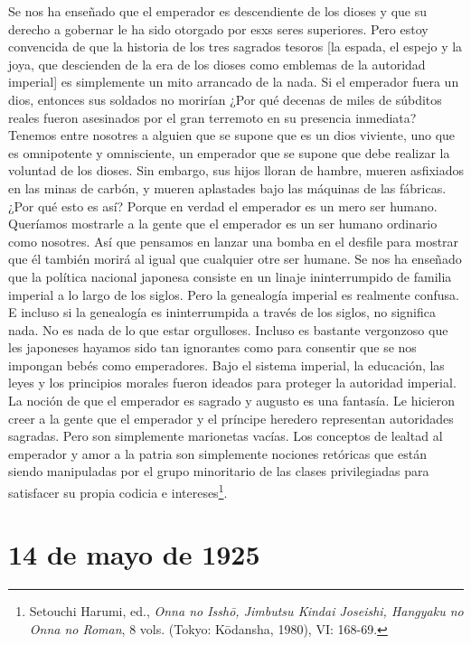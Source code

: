 \documentclass[
]{book}
\begin{document}
Se nos ha enseñado que el emperador es descendiente de los dioses y que su derecho a gobernar le ha sido otorgado por esxs seres superiores. Pero estoy convencida de que la historia de los tres sagrados tesoros {[}la espada, el espejo y la joya, que descienden de la era de los dioses como emblemas de la autoridad imperial{]} es simplemente un mito arrancado de la nada. Si el emperador fuera un dios, entonces sus soldados no morirían ¿Por qué decenas de miles de súbditos reales fueron asesinados por el gran terremoto en su presencia inmediata? Tenemos entre nosotres a alguien que se supone que es un dios viviente, uno que es omnipotente y omnisciente, un emperador que se supone que debe realizar la voluntad de los dioses. Sin embargo, sus hijos lloran de hambre, mueren asfixiados en las minas de carbón, y mueren aplastades bajo las máquinas de las fábricas. ¿Por qué esto es así? Porque en verdad el emperador es un mero ser humano. Queríamos mostrarle a la gente que el emperador es un ser humano ordinario como nosotres. Así que pensamos en lanzar una bomba en el desfile para mostrar que él también morirá al igual que cualquier otre ser humane.
Se nos ha enseñado que la política nacional japonesa consiste en un linaje ininterrumpido de familia imperial a lo largo de los siglos. Pero la genealogía imperial es realmente confusa. E incluso si la genealogía es ininterrumpida a través de los siglos, no significa nada. No es nada de lo que estar orgulloses. Incluso es bastante vergonzoso que les japoneses hayamos sido tan ignorantes como para consentir que se nos impongan bebés como emperadores.
Bajo el sistema imperial, la educación, las leyes y los principios morales fueron ideados para proteger la autoridad imperial. La noción de que el emperador es sagrado y augusto es una fantasía. Le hicieron creer a la gente que el emperador y el príncipe heredero representan autoridades sagradas. Pero son simplemente marionetas vacías. Los conceptos de lealtad al emperador y amor a la patria son simplemente nociones retóricas que están siendo manipuladas por el grupo minoritario de las clases privilegiadas para satisfacer su propia codicia e intereses\footnote{Setouchi Harumi, ed., \emph{Onna no Isshō, Jimbutsu Kindai Joseishi, Hangyaku no Onna no Roman}, 8 vols. (Tokyo: Kōdansha, 1980), VI: 168-69.}.

\hypertarget{de-mayo-de-1925}{%
\chapter*{14 de mayo de 1925}\label{de-mayo-de-1925}}
\end{document}
